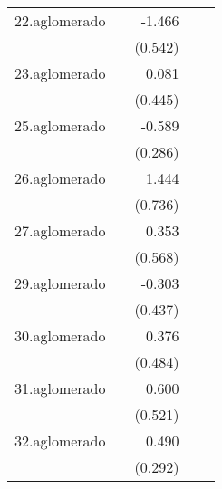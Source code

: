 {\begin{longtable}{l*{4}{D{.}{.}{-1}}}
\addlinespace
22.aglomerado&                     &      -1.466\sym{**} &                     &                     \\
            &                     &     (0.542)         &                     &                     \\
\addlinespace
23.aglomerado&                     &       0.081         &                     &                     \\
            &                     &     (0.445)         &                     &                     \\
\addlinespace
25.aglomerado&                     &      -0.589\sym{*}  &                     &                     \\
            &                     &     (0.286)         &                     &                     \\
\addlinespace
26.aglomerado&                     &       1.444\sym{*}  &                     &                     \\
            &                     &     (0.736)         &                     &                     \\
\addlinespace
27.aglomerado&                     &       0.353         &                     &                     \\
            &                     &     (0.568)         &                     &                     \\
\addlinespace
29.aglomerado&                     &      -0.303         &                     &                     \\
            &                     &     (0.437)         &                     &                     \\
\addlinespace
30.aglomerado&                     &       0.376         &                     &                     \\
            &                     &     (0.484)         &                     &                     \\
\addlinespace
31.aglomerado&                     &       0.600         &                     &                     \\
            &                     &     (0.521)         &                     &                     \\
\addlinespace
32.aglomerado&                     &       0.490         &                     &                     \\
            &                     &     (0.292)         &                     &                     \\

\end{longtable}}
